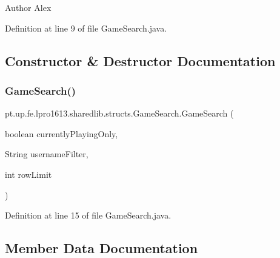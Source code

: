 \begin{DoxyAuthor}{Author}
Alex 
\end{DoxyAuthor}


Definition at line 9 of file Game\+Search.\+java.



\subsection{Constructor \& Destructor Documentation}
\hypertarget{classpt_1_1up_1_1fe_1_1lpro1613_1_1sharedlib_1_1structs_1_1_game_search_ab6fd8a05a11c13040f547e61f1010af0}{}\label{classpt_1_1up_1_1fe_1_1lpro1613_1_1sharedlib_1_1structs_1_1_game_search_ab6fd8a05a11c13040f547e61f1010af0} 
\subsubsection{\texorpdfstring{Game\+Search()}{GameSearch()}}
{\footnotesize\ttfamily pt.\+up.\+fe.\+lpro1613.\+sharedlib.\+structs.\+Game\+Search.\+Game\+Search (\begin{DoxyParamCaption}\item[{boolean}]{currently\+Playing\+Only,  }\item[{String}]{username\+Filter,  }\item[{int}]{row\+Limit }\end{DoxyParamCaption})}



Definition at line 15 of file Game\+Search.\+java.



\subsection{Member Data Documentation}
\hypertarget{classpt_1_1up_1_1fe_1_1lpro1613_1_1sharedlib_1_1structs_1_1_game_search_a5e93514e466b4c5742b7d639c7d8412d}{}\label{classpt_1_1up_1_1fe_1_1lpro1613_1_1sharedlib_1_1structs_1_1_game_search_a5e93514e466b4c5742b7d639c7d8412d} 

